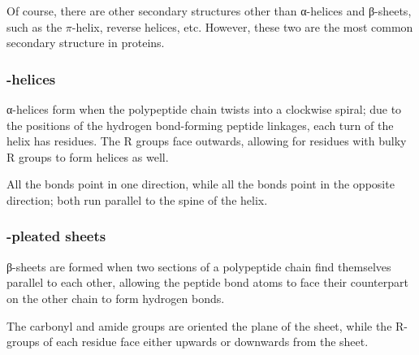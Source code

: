 			Of course, there are other secondary structures other than α-helices and β-sheets, such as the $\pi$-helix, reverse helices, etc.
			However, these two are the most common secondary structure in proteins.


			\pagebreak
			\subsubsection{\chemalpha-helices}

				α-helices form when the polypeptide chain twists into a clockwise spiral; due to the positions of the
				hydrogen bond-forming peptide linkages, each turn of the helix has  residues. The R groups face outwards, allowing for
				residues with bulky R groups to form helices as well.

				All the  bonds point in one direction, while all the  bonds point in the opposite direction; both run parallel
				to the spine of the helix.




			\subsubsection{\chembeta-pleated sheets}

				β-sheets are formed when two sections of a polypeptide chain find themselves parallel to each other, allowing the peptide bond
				atoms to face their counterpart on the other chain to form hydrogen bonds.

				The carbonyl and amide groups are oriented  the plane of the sheet, while the R-groups of each residue face either
				upwards or downwards from the sheet.

